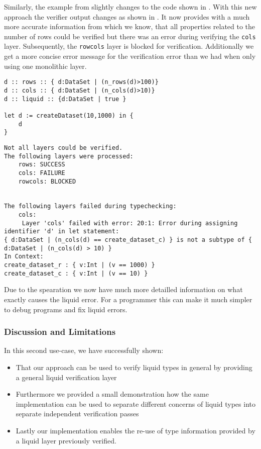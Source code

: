 Similarly, the example from  slightly changes to the code shown in . With this new approach the verifier output changes as shown in . It now provides with a much more accurate information from which we know, that all properties related to the number of rows could be verified but there was an error during verifying the \texttt{cols} layer. Subsequently, the \texttt{rowcols} layer is blocked for verification. Additionally we get a more concise error message for the verification error than we had when only using one monolithic layer.
\begin{lstlisting}[caption={Adapted version of \Cref{lst:uc2_fail_monolithic} that uses separate layers},label={lst:uc2_fail_separate}]
d :: rows :: { d:DataSet | (n_rows(d)>100)}
d :: cols :: { d:DataSet | (n_cols(d)>10)}
d :: liquid :: {d:DataSet | true }

let d := createDataset(10,1000) in {
	d
}
\end{lstlisting}
\begin{lstlisting}[caption={Verifier output produced by \Cref{lst:uc2_fail_separate}},label=lst:uc2_error_separate,numbers=none]
Not all layers could be verified.
The following layers were processed:
	rows: SUCCESS
	cols: FAILURE
	rowcols: BLOCKED


The following layers failed during typechecking:
	cols:
	 Layer 'cols' failed with error: 20:1: Error during assigning identifier 'd' in let statement:
{ d:DataSet | (n_cols(d) == create_dataset_c) } is not a subtype of { d:DataSet | (n_cols(d) > 10) }
In Context:
create_dataset_r : { v:Int | (v == 1000) }
create_dataset_c : { v:Int | (v == 10) }
\end{lstlisting}

Due to the spearation we now have much more detailled information on what exactly causes the liquid error. For a programmer this can make it much simpler to debug programs and fix liquid errors.

\subsubsection{Discussion and Limitations}
\label{sssec:uc2_discussion}

In this second use-case, we have successfully shown:
\begin{itemize}
	\item That our approach can be used to verify liquid types in general by providing a general liquid verification layer
	\item Furthermore we provided a small demonstration how the same implementation can be used to separate different concerns of liquid types into separate independent verification passes
	\item Lastly our implementation enables the re-use of type information provided by a liquid layer previously verified.
\end{itemize}

